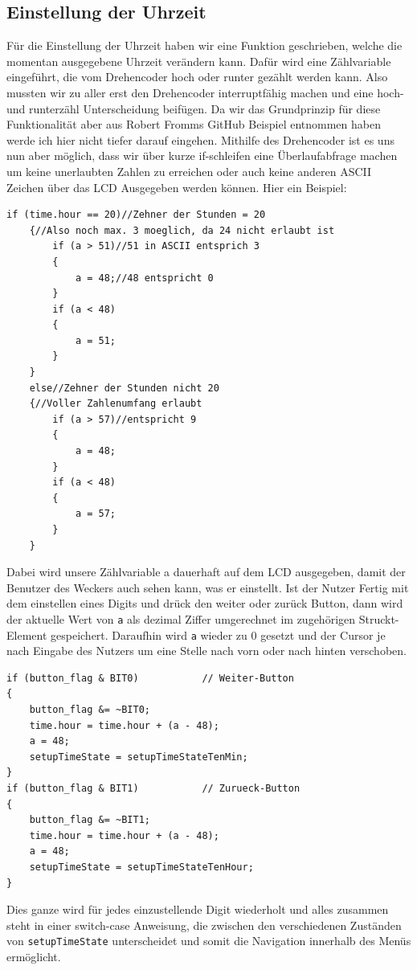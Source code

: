 \documentclass[openright,twoside,11pt,a4paper]{scrartcl}
\begin{document}
\begin{flushleft}
		 \subsection{Einstellung der Uhrzeit}
	 	Für die Einstellung der Uhrzeit haben wir eine Funktion geschrieben, welche die momentan ausgegebene Uhrzeit verändern kann. Dafür wird eine Zählvariable eingeführt, die vom Drehencoder hoch oder runter gezählt werden kann. Also mussten wir zu aller erst den Drehencoder interruptfähig machen und eine hoch- und runterzähl Unterscheidung beifügen. Da wir das Grundprinzip für diese Funktionalität aber aus Robert Fromms GitHub Beispiel entnommen haben werde ich hier nicht tiefer darauf eingehen. Mithilfe des Drehencoder ist es uns nun aber möglich, dass wir über kurze if-schleifen eine Überlaufabfrage machen um keine unerlaubten Zahlen zu erreichen oder auch keine anderen ASCII Zeichen über das LCD Ausgegeben werden können. Hier ein Beispiel:
	 	\begin{lstlisting}
if (time.hour == 20)//Zehner der Stunden = 20
	{//Also noch max. 3 moeglich, da 24 nicht erlaubt ist
		if (a > 51)//51 in ASCII entsprich 3
		{
			a = 48;//48 entspricht 0
		}
		if (a < 48)
		{
			a = 51;
		}
	}
	else//Zehner der Stunden nicht 20
	{//Voller Zahlenumfang erlaubt
		if (a > 57)//entspricht 9
		{
			a = 48;
		}
		if (a < 48)
		{
			a = 57;
		}
	}
	 	\end{lstlisting}
	 	Dabei wird unsere Zählvariable a dauerhaft auf dem LCD ausgegeben, damit der Benutzer des Weckers auch sehen kann, was er einstellt. Ist der Nutzer Fertig mit dem einstellen eines Digits und drück den weiter oder zurück Button, dann wird der aktuelle Wert von \lstinline[language=c++]|a| als dezimal Ziffer umgerechnet im zugehörigen Struckt-Element gespeichert. Daraufhin wird \lstinline[language=c++]|a| wieder zu 0 gesetzt und der Cursor je nach Eingabe des Nutzers um eine Stelle nach vorn oder nach hinten verschoben.
	 	\begin{lstlisting}
if (button_flag & BIT0)           // Weiter-Button
{
	button_flag &= ~BIT0;
	time.hour = time.hour + (a - 48);
	a = 48;
	setupTimeState = setupTimeStateTenMin;
}
if (button_flag & BIT1)           // Zurueck-Button
{
	button_flag &= ~BIT1;
	time.hour = time.hour + (a - 48);
	a = 48;
	setupTimeState = setupTimeStateTenHour;
}
	 	\end{lstlisting}
	 	Dies ganze wird für jedes einzustellende Digit wiederholt und alles zusammen steht in einer switch-case Anweisung, die zwischen den verschiedenen Zuständen von \lstinline[language=c++]|setupTimeState| unterscheidet und somit die Navigation innerhalb des Menüs ermöglicht. \\

\end{flushleft}
\end{document}
